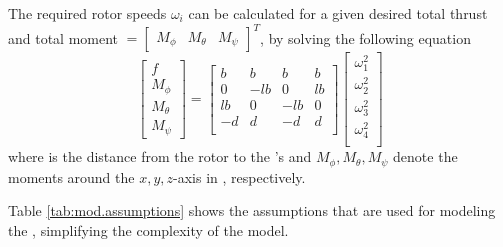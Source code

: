 The required rotor speeds $ \omega_i $ can be calculated for a given desired total thrust  and total moment $=\begin{bmatrix}	M_\phi&M_\theta&M_\psi	\end{bmatrix}^T  $, by solving the following equation
\begin{equation}\label{eq:omega_i}
\begin{bmatrix}
f\\M_\phi\\M_\theta\\M_\psi
\end{bmatrix}=
\begin{bmatrix}
b&b&b&b\\
0&-lb&0&lb\\
lb&0&-lb&0\\
-d&d&-d&d\\
\end{bmatrix}
\begin{bmatrix}
\omega_1^2\\
\omega_2^2\\
\omega_3^2\\
\omega_4^2\\
\end{bmatrix}
\end{equation}
where  is the distance from the rotor to the 's  and $ M_\phi, M_\theta, M_\psi $ denote the moments around the $ x, y, z $-axis in \BF, respectively. 

Table \ref{tab:mod.assumptions} shows the assumptions that are used for modeling the , simplifying the complexity of the model.

